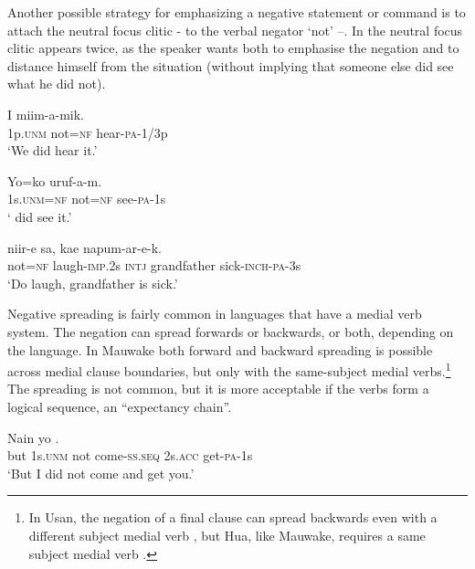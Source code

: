 Another possible strategy for emphasizing a negative statement or command is to attach the neutral focus clitic - to the verbal negator  `not' --. In  the neutral focus clitic appears twice, as the speaker wants both to emphasise the negation and to distance himself from the situation (without implying that someone else did see what he did not). 

\ea%
\label{ex:6:x1152}
\gll I    miim-a-mik. \\
1p.\textsc{unm}  not=\textsc{nf}  hear-\textsc{pa}-1/3p\\
\glt `We did  hear it.'
\z

\ea%
\label{ex:6:x1136}
\gll Yo=ko    uruf-a-m. \\
1s.\textsc{unm}=\textsc{nf}  not=\textsc{nf}  see-\textsc{pa}-1s\\
\glt ` did  see it.'
\z

\ea%
\label{ex:6:x1137}
\gll {}  niir-e  sa,  kae  napum-ar-e-k. \\
not=\textsc{nf}  laugh-\textsc{imp}.2s  \textsc{intj}  grandfather  sick-\textsc{inch}-\textsc{pa}-3s\\
\glt `Do  laugh, grandfather is sick.'
\z

Negative spreading is fairly common in languages that have a medial verb system. The negation can spread forwards or backwards, or both, depending on the language. In Mauwake both forward  and backward  spreading is possible across medial clause boundaries, but only with the same-subject medial verbs.\footnote{In Usan, the negation of a final clause can spread backwards even with a different subject medial verb  \citep[282]{Reesink1987}, but Hua, like Mauwake, requires a same subject medial verb \citep[408]{Haiman1980}.} The spreading is not common, but it is more acceptable if the verbs form a logical sequence, an ``expectancy chain''.

\ea%
\label{ex:6:x1138}
\gll Nain  yo        . \\
but  1s.\textsc{unm}  not  come-\textsc{ss}.\textsc{seq}  2s.\textsc{acc}  get-\textsc{pa}-1s\\
\glt `But I did not come and get you.'
\z


